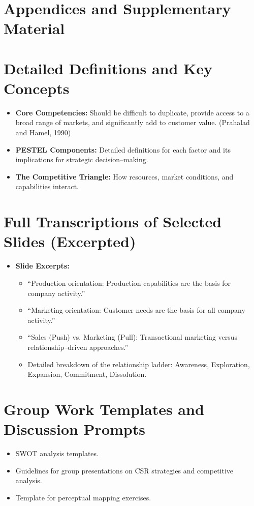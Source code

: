\documentclass[12pt,a4paper]{report}
\begin{document}
\chapter{Appendices and Supplementary Material}

\appendix

\chapter{Detailed Definitions and Key Concepts}
\begin{itemize}
    \item \textbf{Core Competencies:} Should be difficult to duplicate, provide access to a broad range of markets, and significantly add to customer value. (Prahalad and Hamel, 1990)
    \item \textbf{PESTEL Components:} Detailed definitions for each factor and its implications for strategic decision--making.
    \item \textbf{The Competitive Triangle:} How resources, market conditions, and capabilities interact.
\end{itemize}

\chapter{Full Transcriptions of Selected Slides (Excerpted)}
\begin{itemize}
    \item \textbf{Slide Excerpts:}
    \begin{itemize}
         \item ``Production orientation: Production capabilities are the basis for company activity.'' 
         \item ``Marketing orientation: Customer needs are the basis for all company activity.'' 
         \item ``Sales (Push) vs. Marketing (Pull): Transactional marketing versus relationship--driven approaches.'' 
         \item Detailed breakdown of the relationship ladder: Awareness, Exploration, Expansion, Commitment, Dissolution.
    \end{itemize}
\end{itemize}

\chapter{Group Work Templates and Discussion Prompts}
\begin{itemize}
    \item SWOT analysis templates.
    \item Guidelines for group presentations on CSR strategies and competitive analysis.
    \item Template for perceptual mapping exercises.
\end{itemize}
\end{document}
